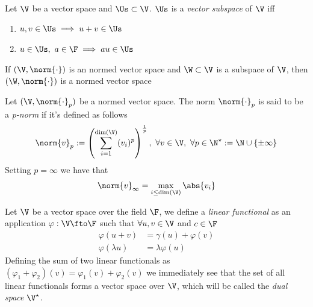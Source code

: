 \documentclass[../mmf.tex]{subfiles}
\begin{document}
\begin{dfn}
	Let $\V$ be a vector space and $\Us\subset\V$. $\Us$ is a \textit{vector subspace} of $\V$ iff
	\begin{enumerate}
	\item $u,v\in\Us\implies{} u+v\in\Us$
	\item $u\in\Us,\ a\in\F\implies{} au\in\Us$
	\end{enumerate}
\end{dfn}
\begin{prop}
	If $(\V,\norm{\cdot})$ is an normed vector space and $\W\subset\V$ is a subspace of $\V$, then $(\W,\norm{\cdot})$ is a normed vector space
\end{prop}
\begin{dfn}[p-norm]
	Let $(\V,\norm{\cdot}_p)$ be a normed vector space. The norm $\norm{\cdot}_p$ is said to be a \textit{p-norm} if it's defined as follows
	\begin{equation}
		\norm{v}_p:=\left( \sum_{i=1}^{\dim(\V)}(v_i)^p \right)^{\frac{1}{p}},\ \forall v\in\V,\ \forall p\in\N^{\star}:=\N\cup\{\pm\infty\}
		\label{eq:pnorm}
	\end{equation}
	Setting $p=\infty$ we have that
	\begin{equation}
		\norm{v}_{\infty}=\max_{i\le\dim(\V)}\abs{v_i}
		\label{eq:inftynorm}
	\end{equation}
\end{dfn}
\begin{dfn}
	Let $\V$ be a vector space over the field $\F$, we define a \textit{linear functional} as an application $\varphi:\V\fto\F$ such that $\forall u,v\in\V$ and $c\in\F$
	\begin{equation}
		\begin{aligned}
			\varphi(u+v)&=\gamma(u)+\varphi(v)\\
			\varphi(\lambda u)&=\lambda\varphi(u)
		\end{aligned}
		\label{eq:linearfunctional}
	\end{equation}
	Defining the sum of two linear functionals as $(\varphi_1+\varphi_2)(v)=\varphi_1(v)+\varphi_2(v)$ we immediately see that the set of all linear functionals forms a vector space over $\V$, which will be called the \textit{dual space} $\V^\star$.
\end{dfn}
\end{document}
